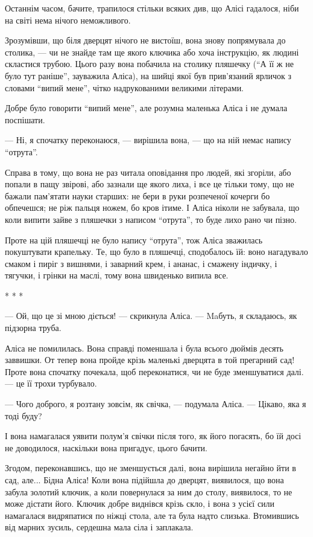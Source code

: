 Останнім часом, бачите, трапилося стільки всяких див, що Алісі гадалося, ніби
на світі нема нічого неможливого.

Зрозумівши, що біля дверцят нічого не вистоїш, вона знову попрямувала до
столика, — чи не знайде там ще якого ключика або хоча інструкцію, як людині
скластися трубою. Цього разу вона побачила на столику пляшечку (\enquote{А її ж не було
тут раніше}, зауважила Аліса), на шийці якої був прив’язаний ярличок з словами
\enquote{випий мене}, чітко надрукованими великими літерами.

Добре було говорити \enquote{випий мене}, але розумна маленька Аліса і не думала
поспішати.

— Ні, я спочатку переконаюся, — вирішила вона, — що на ній немає напису
\enquote{отрута}.

Справа в тому, що вона не раз читала оповідання про людей, які згоріли, або
попали в пащу звірові, або зазнали ще якого лиха, і все це тільки тому, що не
бажали пам'ятати науки старших: не бери в руки розпеченої кочерги бо обпечешся;
не ріж пальця ножем, бо кров ітиме. І Аліса ніколи не забувала, що коли випити
зайве з пляшечки з написом \enquote{отрута}, то буде лихо рано чи пізно.

Проте на цій пляшечці не було напису \enquote{отрута}, тож Аліса зважилась покуштувати
крапельку. Те, що було в пляшечці, сподобалось їй: воно нагадувало смаком і
пиріг з вишнями, і заварний крем, і ананас, і смажену індичку, і тягучки, і
грінки на маслі, тому вона швиденько випила все.

* * *

— Ой, що це зі мною діється! — скрикнула Аліса. — Maбуть, я складаюсь, як
підзорна труба.

Аліса не помилилась. Вона справді поменшала і була всього дюймів десять
заввишки. От тепер вона пройде крізь маленькі дверцята в той прегарний сад!
Проте вона спочатку почекала, щоб переконатися, чи не буде зменшуватися далі. —
це її трохи турбувало.

— Чого доброго, я розтану зовсім, як свічка, — подумала Аліса. — Цікаво, яка я
тоді буду?

І вона намагалася уявити полум'я свічки після того, як його погасять, бо їй
досі не доводилося, наскільки вона пригадує, цього бачити.

Згодом, переконавшись, що не зменшується далі, вона вирішила негайно йти в сад,
але... Бідна Аліса! Коли вона підійшла до дверцят, виявилося, що вона забула
золотий ключик, а коли повернулася за ним до столу, виявилося, то не може
дістати його. Ключик добре виднівся крізь скло, і вона з усієї сили намагалася
видряпатися по ніжці стола, але та була надто слизька. Втомившись від марних
зусиль, сердешна мала сіла і заплакала.

